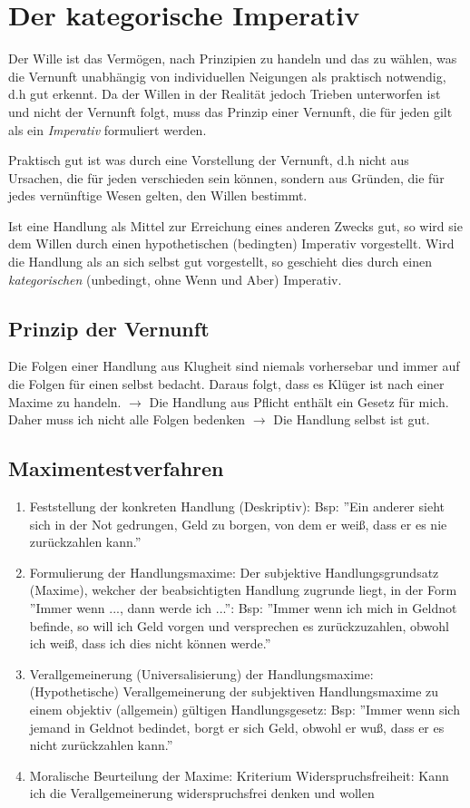 \documentclass{article}
\begin{document}
\section*{Der kategorische Imperativ}
Der Wille ist das Vermögen, nach Prinzipien zu handeln und das zu wählen, was die Vernunft unabhängig von individuellen 
Neigungen als praktisch notwendig, d.h gut erkennt. Da der Willen in der Realität jedoch Trieben unterworfen ist und
nicht der Vernunft folgt, muss das Prinzip einer Vernunft, die für jeden gilt als ein \emph{Imperativ} formuliert werden.

Praktisch gut ist was durch eine Vorstellung der Vernunft, d.h nicht aus Ursachen, die für jeden verschieden sein können,
sondern aus Gründen, die für jedes vernünftige Wesen gelten, den Willen bestimmt.

Ist eine Handlung als Mittel zur Erreichung eines anderen Zwecks gut, so wird sie dem Willen durch einen hypothetischen
(bedingten) Imperativ vorgestellt. Wird die Handlung als an sich selbst gut vorgestellt, so geschieht dies durch einen
\emph{kategorischen} (unbedingt, ohne Wenn und Aber) Imperativ.

\subsection*{Prinzip der Vernunft}
Die Folgen einer Handlung aus Klugheit sind niemals vorhersebar und immer auf die Folgen für einen selbst bedacht.
Daraus folgt, dass es Klüger ist nach einer Maxime zu handeln.
$\rightarrow$
Die Handlung aus Pflicht enthält ein Gesetz für mich. Daher muss ich nicht alle Folgen bedenken $\rightarrow$
Die Handlung selbst ist gut.

\subsection*{Maximentestverfahren}
\begin{enumerate}
    \item Feststellung der konkreten Handlung (Deskriptiv):
    Bsp: ''Ein anderer sieht sich in der Not gedrungen, Geld zu borgen, von dem er weiß, dass er es nie zurückzahlen kann.''
    \item Formulierung der Handlungsmaxime:
    Der subjektive Handlungsgrundsatz (Maxime), wekcher der beabsichtigten Handlung zugrunde liegt, in der Form
    ''Immer wenn ..., dann werde ich ...'':
    Bsp: ''Immer wenn ich mich in Geldnot befinde, so will ich Geld vorgen und versprechen es zurückzuzahlen, obwohl
    ich weiß, dass ich dies nicht können werde.''
    \item Verallgemeinerung (Universalisierung) der Handlungsmaxime:
    (Hypothetische) Verallgemeinerung der subjektiven Handlungsmaxime zu einem objektiv (allgemein) gültigen
    Handlungsgesetz:
    Bsp: ''Immer wenn sich jemand in Geldnot bedindet, borgt er sich Geld, obwohl er wuß, dass er es nicht zurückzahlen kann.''
    \item Moralische Beurteilung der Maxime: Kriterium Widerspruchsfreiheit:
    Kann ich die Verallgemeinerung widerspruchsfrei denken und wollen
\end{enumerate}
\end{document}
